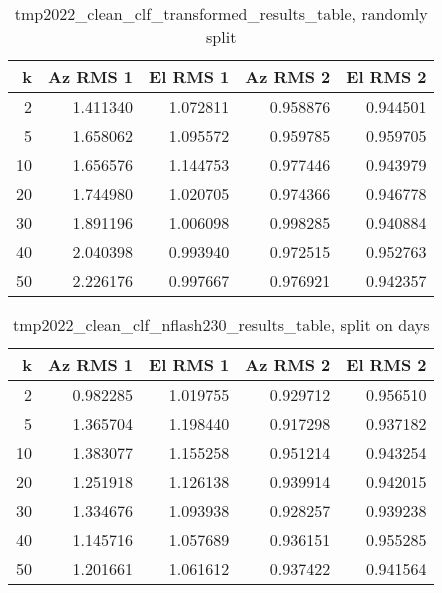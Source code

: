 \begin{table}[h]
    \centering
    \caption{tmp2022_clean_clf_transformed_results_table, randomly split}
    \begin{tabular}{rrrrr}
        \toprule
        k & Az RMS 1 & El RMS 1 & Az RMS 2 & El RMS 2 \\
        \midrule
         2 &  1.411340 & 1.072811 &  0.958876 &  0.944501 \\
         5 &  1.658062 & 1.095572 &  0.959785 &  0.959705 \\
        10 &  1.656576 & 1.144753 &  0.977446 &  0.943979 \\
        20 &  1.744980 & 1.020705 &  0.974366 &  0.946778 \\
        30 &  1.891196 & 1.006098 &  0.998285 &  0.940884 \\
        40 &  2.040398 & 0.993940 &  0.972515 &  0.952763 \\
        50 &  2.226176 & 0.997667 &  0.976921 &  0.942357 \\
    \bottomrule
\end{tabular}
\end{table}
\begin{table}[h]
    \centering
    \caption{tmp2022_clean_clf_nflash230_results_table, split on days}
    \begin{tabular}{rrrrr}
        \toprule
         k & Az RMS 1 & El RMS 1 & Az RMS 2 & El RMS 2 \\
        \midrule
         2 &  0.982285 & 1.019755 &  0.929712 &  0.956510 \\
         5 &  1.365704 & 1.198440 &  0.917298 &  0.937182 \\
        10 &  1.383077 & 1.155258 &  0.951214 &  0.943254 \\
        20 &  1.251918 & 1.126138 &  0.939914 &  0.942015 \\
        30 &  1.334676 & 1.093938 &  0.928257 &  0.939238 \\
        40 &  1.145716 & 1.057689 &  0.936151 &  0.955285 \\
        50 &  1.201661 & 1.061612 &  0.937422 &  0.941564 \\
        \bottomrule
    \end{tabular}
\end{table}


